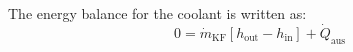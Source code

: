 The energy balance for the coolant is written as:  
\[
0 = \dot{m}_{\text{KF}} \left[ h_{\text{out}} - h_{\text{in}} \right] + \dot{Q}_{\text{aus}}
\]